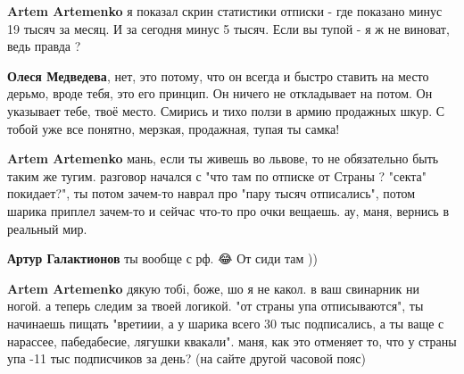 \begin{itemize}
\begin{itemize}
 
\textbf{Artem Artemenko} я показал скрин статистики отписки - где показано минус 19 тысяч за месяц. И за сегодня минус 5 тысяч. Если вы тупой - я ж не виноват, ведь правда ?

 
\textbf{Олеся Медведева}, нет, это потому, что он всегда и быстро ставить на место дерьмо, вроде тебя, это его принцип. Он ничего не откладывает на потом. Он указывает тебе, твоё место. Смирись и тихо ползи в армию продажных шкур. С тобой уже все понятно, мерзкая, продажная, тупая ты самка!

 
\textbf{Artem Artemenko} мань, если ты живешь во львове, то не обязательно быть таким же тугим. разговор начался с "что там по отписке от Страны ? "секта" покидает?", ты потом зачем-то наврал про "пару тысяч отписались", потом шарика приплел зачем-то и сейчас что-то про очки вещаешь. ау, маня, вернись в реальный мир.

 
\textbf{Артур Галактионов} ты вообще с рф. 😂
От сиди там ))

 
\textbf{Artem Artemenko} дякую тобi, боже, шо я не какол. в ваш свинарник ни ногой. а теперь следим за твоей логикой. "от страны упа отписываются", ты начинаешь пищать "вретиии, а у шарика всего 30 тыс подписались, а ты ваще с нарассее, пабедабесие, лягушки квакали".
маня, как это отменяет то, что у страны упа -11 тыс подписчиков за день? (на сайте другой часовой пояс)


\end{itemize}
\end{itemize}
